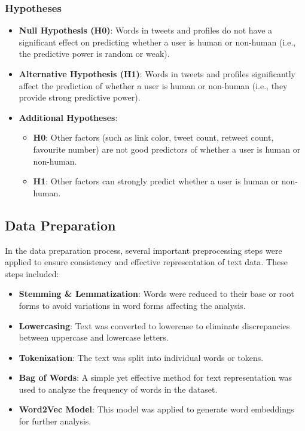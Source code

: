 \documentclass[a4paper,11pt]{article}
\begin{document}
\subsubsection*{Hypotheses}
\begin{itemize}
    \item \textbf{Null Hypothesis (H0)}: Words in tweets and profiles do not have a significant effect on predicting whether a user is human or non-human (i.e., the predictive power is random or weak).
    \item \textbf{Alternative Hypothesis (H1)}: Words in tweets and profiles significantly affect the prediction of whether a user is human or non-human (i.e., they provide strong predictive power).
    \item \textbf{Additional Hypotheses}:
    \begin{itemize}
        \item \textbf{H0}: Other factors (such as link color, tweet count, retweet count, favourite number) are not good predictors of whether a user is human or non-human.
        \item \textbf{H1}: Other factors can strongly predict whether a user is human or non-human.
    \end{itemize}
\end{itemize}

\subsection{Data Preparation}
In the data preparation process, several important preprocessing steps were applied to ensure consistency and effective representation of text data. These steps included:
\begin{itemize}
    \item \textbf{Stemming \& Lemmatization}: Words were reduced to their base or root forms to avoid variations in word forms affecting the analysis.
    \item \textbf{Lowercasing}: Text was converted to lowercase to eliminate discrepancies between uppercase and lowercase letters.
    \item \textbf{Tokenization}: The text was split into individual words or tokens.
    \item \textbf{Bag of Words}: A simple yet effective method for text representation was used to analyze the frequency of words in the dataset.
    \item \textbf{Word2Vec Model}: This model was applied to generate word embeddings for further analysis.
\end{itemize}
\end{document}
